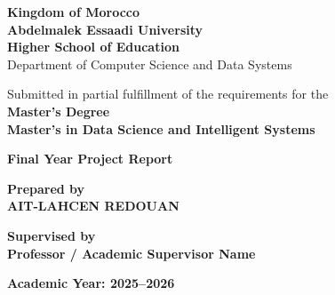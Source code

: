 \begin{titlepage}
    \thispagestyle{empty}
    \begin{center}
        \begin{minipage}[t]{0.42\textwidth}
            \raggedright
            \coverlogobox{\SchoolLogo}
        \end{minipage}
        \hfill
        \begin{minipage}[t]{0.42\textwidth}
            \raggedleft
            \coverlogobox{\UniversityLogo}
        \end{minipage}

        \vspace{1.6cm}

        {\bfseries Kingdom of Morocco}\\
        {\bfseries Abdelmalek Essaadi University}\\
        {\bfseries Higher School of Education}\\
        {Department of Computer Science and Data Systems}

        \vspace{1.2cm}

        Submitted in partial fulfillment of the requirements for the\\
        {\bfseries Master's Degree}\\
        {\bfseries Master's in Data Science and Intelligent Systems}

        \vspace{1.2cm}

        {\bfseries Final Year Project Report}

        \vspace{0.8cm}


        \vfill

        {\bfseries Prepared by}\\
        {\large\bfseries AIT-LAHCEN REDOUAN}

        \vspace{0.8cm}

        {\bfseries Supervised by}\\
        {\bfseries Professor / Academic Supervisor Name}

        \vspace{0.8cm}

        {\bfseries Academic Year: 2025--2026}
    \end{center}
\end{titlepage}
